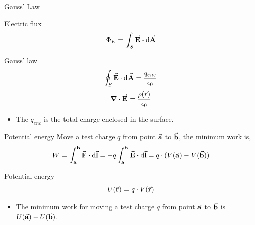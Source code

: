 \documentclass{beamer}
\begin{document}
\begin{frame}{Gauss' Law}
	\begin{beamerboxesrounded}{Electric flux}
		\begin{equation}
			\Phi_E = \int_{S} \va{E} \vdot \dd{\va{A}}
		\end{equation}
	\end{beamerboxesrounded}
	\vspace{1em}
	\begin{beamerboxesrounded}{Gauss' law}
		\begin{equation}
			\oint_{S} \va{E} \cdot \dd{\va{A}} = \frac{q_{enc}}{\epsilon_0}
		\end{equation}
		\begin{equation}
			\div \va{E} = \frac{\rho(\vec{r})}{\epsilon_0}
		\end{equation}
	\end{beamerboxesrounded}
	\begin{itemize}
		\item The $q_{enc}$ is the total charge enclosed in the surface.
	\end{itemize}
\end{frame}


\begin{frame}{Potential energy}
    Move a test charge $q$ from point $\va{a}$ to $\va{b}$, the minimum work is,
    \begin{equation}
        W = \int_{\vb{a}}^{\vb{b}} \va{F} \vdot \dd{\va{l}} = -q \int_{\vb{a}}^{\vb{b}} \va{E} \vdot \dd{\va{l}} = q \cdot (V(\va{a}) - V(\va{b}))
    \end{equation}

    \begin{block}{Potential energy}
        \begin{equation}
            U(\va{r}) = q \cdot V(\va{r})
        \end{equation}
    \end{block}

    \begin{itemize}
        \item The minimum work for moving a test charge $q$ from point $\va{a}$ to $\va{b}$ is $U(\va{a}) - U(\va{b})$.
    \end{itemize}
\end{frame}
\end{document}
